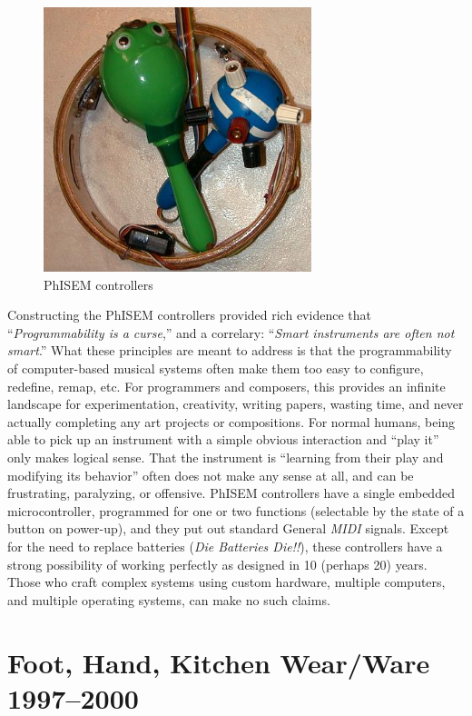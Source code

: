 \begin{figure}[t]
\centering
\includegraphics[width=78mm]{Figure5PhiSEM.jpg}
\caption{PhISEM controllers}
\label{Cook:cook-fig:4}       %
\end{figure}


Constructing the PhISEM controllers provided rich evidence that ``\textit{Programmability is a curse},'' and a correlary: ``\textit{Smart instruments are often not smart}.''  What these principles are meant to address is that the programmability of computer-based musical systems often make them too easy to configure, redefine, remap, etc.  For programmers and composers, this provides an infinite landscape for experimentation, creativity, writing papers, wasting time, and never actually completing any art projects or compositions. For normal humans, being able to pick up an instrument with a simple obvious interaction and ``play it'' only makes logical sense.  That the instrument is ``learning from their play and modifying its behavior'' often does not make any sense at all, and can be frustrating, paralyzing, or offensive.  PhISEM controllers have a single embedded microcontroller, programmed for one or two functions (selectable by the state of a button on power-up), and they put out standard General \textit{MIDI} signals.  Except for the need to replace batteries (\textit{Die Batteries Die!!}), these controllers have a strong possibility of working perfectly as designed in 10 (perhaps 20) years.  Those who craft complex systems using custom hardware, multiple computers, and multiple operating systems, can make no such claims.

\section{Foot, Hand, Kitchen Wear/Ware  1997--2000}

